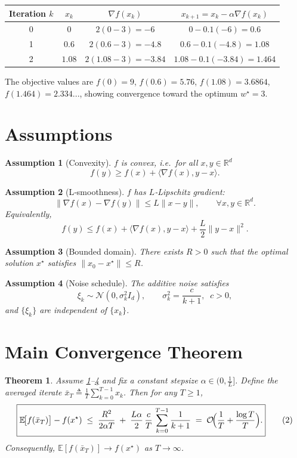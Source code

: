\documentclass{article}
\newtheorem{theorem}{Theorem}
\newtheorem{assumption}{Assumption}
\newcommand{\E}{\mathbb{E}}
\newcommand{\R}{\mathbb{R}}
\begin{document}
\begin{center}
\begin{tabular}{c|c|c|c}
Iteration $k$ & $x_{k}$ & $\nabla f(x_{k})$ & $x_{k+1}=x_{k}-\alpha\nabla f(x_{k})$ \\ \hline
0 & $0$ & $2(0-3)=-6$ & $0-0.1(-6)=0.6$ \\
1 & $0.6$ & $2(0.6-3)=-4.8$ & $0.6-0.1(-4.8)=1.08$ \\
2 & $1.08$ & $2(1.08-3)=-3.84$ & $1.08-0.1(-3.84)=1.464$ \\
\end{tabular}
\end{center}
The objective values are $f(0)=9$, $f(0.6)=5.76$, $f(1.08)=3.6864$, $f(1.464)=2.334...$, showing convergence toward the optimum $w^{\star}=3$.

\section*{Assumptions}
\begin{assumption}[Convexity]\label{as:convex}
$f$ is convex, i.e.\ for all $x,y\in\R^{d}$
\[
f(y)\ge f(x)+\langle\nabla f(x),y-x\rangle .
\]
\end{assumption}
\begin{assumption}[L‑smoothness]\label{as:smooth}
$f$ has $L$‑Lipschitz gradient:
\[
\|\nabla f(x)-\nabla f(y)\|\le L\|x-y\|,\qquad\forall x,y\in\R^{d}.
\]
Equivalently,
\[
f(y)\le f(x)+\langle\nabla f(x),y-x\rangle+\frac{L}{2}\|y-x\|^{2}.
\]
\end{assumption}
\begin{assumption}[Bounded domain]\label{as:bounded}
There exists $R>0$ such that the optimal solution $x^{\star}$ satisfies $\|x_{0}-x^{\star}\|\le R$.
\end{assumption}
\begin{assumption}[Noise schedule]\label{as:noise}
The additive noise satisfies
\[
\xi_{k}\sim\mathcal N(0,\sigma_{k}^{2}I_{d}),\qquad 
\sigma_{k}^{2}=\frac{c}{k+1},\;\;c>0,
\]
and $\{\xi_{k}\}$ are independent of $\{x_{k}\}$.
\end{assumption}

\section*{Main Convergence Theorem}
\begin{theorem}\label{thm:main}
Assume \ref{as:convex}–\ref{as:noise} and fix a constant stepsize $\alpha\in\bigl(0,\tfrac{1}{L}\bigr]$.  
Define the averaged iterate $\bar x_{T}\triangleq\frac1T\sum_{k=0}^{T-1}x_{k}$.  
Then for any $T\ge1$,
\[
\boxed{
\E\!\bigl[f(\bar x_{T})\bigr]-f(x^{\star})
\;\le\;
\frac{R^{2}}{2\alpha T}
\;+\;
\frac{L\alpha}{2}\,\frac{c}{T}\,
\sum_{k=0}^{T-1}\frac{1}{k+1}
\;=\;
\mathcal O\!\Bigl(\frac{1}{T}+\frac{\log T}{T}\Bigr).
}
\tag{2}
\]
Consequently, $\E[f(\bar x_{T})]\to f(x^{\star})$ as $T\to\infty$.
\end{theorem}
\end{document}
